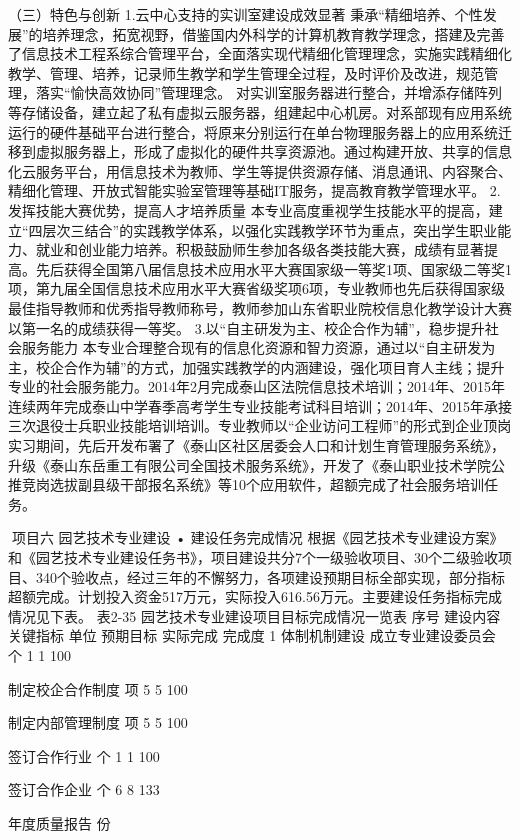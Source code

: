 （三）特色与创新
1.云中心支持的实训室建设成效显著
秉承“精细培养、个性发展”的培养理念，拓宽视野，借鉴国内外科学的计算机教育教学理念，搭建及完善了信息技术工程系综合管理平台，全面落实现代精细化管理理念，实施实践精细化教学、管理、培养，记录师生教学和学生管理全过程，及时评价及改进，规范管理，落实“愉快高效协同”管理理念。
对实训室服务器进行整合，并增添存储阵列等存储设备，建立起了私有虚拟云服务器，组建起中心机房。对系部现有应用系统运行的硬件基础平台进行整合，将原来分别运行在单台物理服务器上的应用系统迁移到虚拟服务器上，形成了虚拟化的硬件共享资源池。通过构建开放、共享的信息化云服务平台，用信息技术为教师、学生等提供资源存储、消息通讯、内容聚合、精细化管理、开放式智能实验室管理等基础IT服务，提高教育教学管理水平。
2.发挥技能大赛优势，提高人才培养质量
本专业高度重视学生技能水平的提高，建立“四层次三结合”的实践教学体系，以强化实践教学环节为重点，突出学生职业能力、就业和创业能力培养。积极鼓励师生参加各级各类技能大赛，成绩有显著提高。先后获得全国第八届信息技术应用水平大赛国家级一等奖1项、国家级二等奖1项，第九届全国信息技术应用水平大赛省级奖项6项，专业教师也先后获得国家级最佳指导教师和优秀指导教师称号，教师参加山东省职业院校信息化教学设计大赛以第一名的成绩获得一等奖。
3.以“自主研发为主、校企合作为辅”，稳步提升社会服务能力
本专业合理整合现有的信息化资源和智力资源，通过以“自主研发为主，校企合作为辅”的方式，加强实践教学的内涵建设，强化项目育人主线；提升专业的社会服务能力。2014年2月完成泰山区法院信息技术培训；2014年、2015年连续两年完成泰山中学春季高考学生专业技能考试科目培训；2014年、2015年承接三次退役士兵职业技能培训培训。专业教师以“企业访问工程师”的形式到企业顶岗实习期间，先后开发布署了《泰山区社区居委会人口和计划生育管理服务系统》，升级《泰山东岳重工有限公司全国技术服务系统》，开发了《泰山职业技术学院公推竞岗选拔副县级干部报名系统》等10个应用软件，超额完成了社会服务培训任务。

项目六  园艺技术专业建设
	•	建设任务完成情况
根据《园艺技术专业建设方案》和《园艺技术专业建设任务书》，项目建设共分7个一级验收项目、30个二级验收项目、340个验收点，经过三年的不懈努力，各项建设预期目标全部实现，部分指标超额完成。计划投入资金517万元，实际投入616.56万元。主要建设任务指标完成情况见下表。
表2-35   园艺技术专业建设项目目标完成情况一览表
序号
建设内容
关键指标
单位
预期目标
实际完成
完成度
1
体制机制建设
成立专业建设委员会
个
1
1
100%


制定校企合作制度
项
5
5
100%


制定内部管理制度
项
5
5
100%


签订合作行业
个
1
1
100%


签订合作企业
个
6
8
133%


年度质量报告
份

